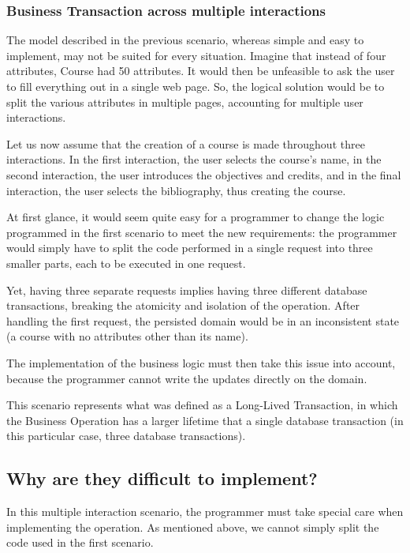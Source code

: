 \documentclass{llncs}
\begin{document}
\subsubsection{Business Transaction across multiple interactions}

The model described in the previous scenario, whereas simple and easy
to implement, may not be suited for every situation. Imagine that
instead of four attributes, Course had 50 attributes. It would then be
unfeasible to ask the user to fill everything out in a single web
page. So, the logical solution would be to split the various
attributes in multiple pages, accounting for multiple user
interactions.

Let us now assume that the creation of a course is made throughout
three interactions. In the first interaction, the user selects the
course's name, in the second interaction, the user introduces the
objectives and credits, and in the final interaction, the user selects
the bibliography, thus creating the course.

At first glance, it would seem quite easy for a programmer to change
the logic programmed in the first scenario to meet the new
requirements: the programmer would simply have to split the code
performed in a single request into three smaller parts, each to be
executed in one request.

Yet, having three separate requests implies having three different
database transactions, breaking the atomicity and isolation of the
operation. After handling the first request, the persisted domain
would be in an inconsistent state (a course with no attributes other
than its name).

The implementation of the business logic must then take this issue
into account, because the programmer cannot write the updates directly
on the domain.

This scenario represents what was defined as a Long-Lived Transaction,
in which the Business Operation has a larger lifetime that a single
database transaction (in this particular case, three database
transactions).

\subsection{Why are they difficult to implement?}
\label{sec:difficult}

In this multiple interaction scenario, the programmer must take
special care when implementing the operation. As mentioned above, we
cannot simply split the code used in the first scenario.
\end{document}
